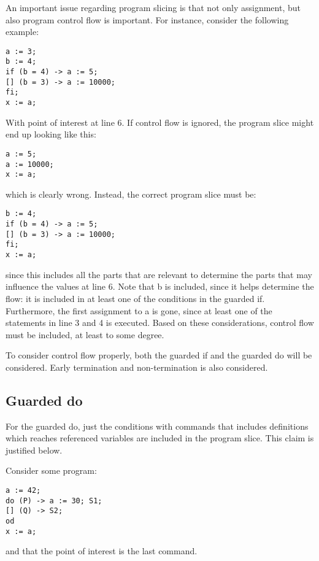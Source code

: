 An important issue regarding program slicing is that not only assignment, but also program control
flow is important. For instance, consider the following example:
\begin{lstlisting}
a := 3;
b := 4;
if (b = 4) -> a := 5;
[] (b = 3) -> a := 10000;
fi;
x := a;
\end{lstlisting}
With point of interest at line 6.
If control flow is ignored, the program slice might end up looking like this:
\begin{lstlisting}
a := 5;
a := 10000;
x := a;
\end{lstlisting}
which is clearly wrong. Instead, the correct program slice must be:
\begin{lstlisting}
b := 4;
if (b = 4) -> a := 5;
[] (b = 3) -> a := 10000;
fi;
x := a;
\end{lstlisting}
since this includes all the parts that are relevant to determine the parts
that may influence the values at line 6.
Note that b is included, since it helps determine the flow: it is included in at least one of the
conditions in the guarded if. Furthermore, the first assignment to a is gone, since at least one of the
statements in line 3 and 4 is executed.
Based on these considerations, control flow must be included, at least to some degree.

To consider control flow properly, both the guarded if and the guarded do will be considered. Early
termination and non-termination is also considered.

\subsection{Guarded do}

For the guarded do, just the conditions with commands that includes definitions which reaches
referenced variables are included in the program slice. This claim is justified below.

Consider some program:
\begin{lstlisting}
a := 42;
do (P) -> a := 30; S1;
[] (Q) -> S2;
od
x := a;
\end{lstlisting}
and that the point of interest is the last command.


